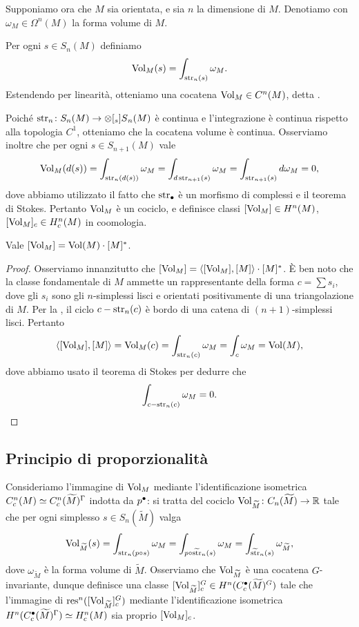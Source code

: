 Supponiamo ora che $M$ sia orientata, e sia $n$ la dimensione di $M$. Denotiamo con $\omega_M\in\Omega^n(M)$ la forma volume di $M$.
\begin{definition}
Per ogni $s\in S_n(M)$ definiamo
\[
\operatorname{Vol}_M(s)=\int_{\operatorname{str}_n(s)}\omega_M.
\]
Estendendo per linearità, otteniamo una cocatena $\operatorname{Vol}_M\in C^n(M)$, detta .
\end{definition}
Poiché $\map{\str_n}{S_n(M)}{\prepost[_s]{S}{_n}(M)}$ è continua e l'integrazione è continua rispetto alla topologia $C^1$, otteniamo che la cocatena volume è continua. Osserviamo inoltre che per ogni $s\in S_{n+1}(M)$ vale
\[
\operatorname{Vol}_M(d(s))=\int_{\operatorname{str}_n(d(s))}\omega_M=\int_{d\operatorname{str}_{n+1}(s)}\omega_M=\int_{\operatorname{str}_{n+1}(s)}d\omega_M=0,
\]
dove abbiamo utilizzato il fatto che $\operatorname{str}_\bullet$ è un morfismo di complessi e il teorema di Stokes. Pertanto $\operatorname{Vol}_M$ è un cociclo, e definisce classi $[\operatorname{Vol}_M]\in H^n(M)$, $[\operatorname{Vol}_M]_c\in H^n_c(M)$ in coomologia.

\begin{lemma}
Vale $[\operatorname{Vol}_M]=\operatorname{Vol}(M)\cdot[M]^*$.
\end{lemma}
\begin{proof}
Osserviamo innanzitutto che $[\operatorname{Vol}_M]=\langle[\operatorname{Vol}_M],[M]\rangle\cdot[M]^*$. È ben noto che la classe fondamentale di $M$ ammette un rappresentante della forma $c=\sum s_i$, dove gli $s_i$ sono gli $n$-simplessi lisci e orientati positivamente di una triangolazione di $M$. Per la , il ciclo $c-\operatorname{str}_n(c)$ è bordo di una catena di $(n+1)$-simplessi lisci. Pertanto
\[
\langle[\operatorname{Vol}_M],[M]\rangle=\operatorname{Vol}_M(c)=\int_{\operatorname{str}_n(c)}\omega_M=\int_{c}\omega_M=\operatorname{Vol}(M),
\]
dove abbiamo usato il teorema di Stokes per dedurre che
\[
\int_{c-\operatorname{str}_n(c)}\omega_M=0.\qedhere
\]
\end{proof}

\subsection{Principio di proporzionalità}

Consideriamo l'immagine di $\operatorname{Vol}_M$ mediante l'identificazione isometrica $C^n_c(M)\simeq C^n_c(\widetilde M)^\Gamma$ indotta da $p^\bullet$: si tratta del cociclo $\map{\Vol_{\widetilde M}}{C_n(\widetilde M)}{\RR}$ tale che per ogni simplesso $s\in S_n(\widetilde M)$ valga
\[
\operatorname{Vol}_{\widetilde M}(s)=\int_{\operatorname{str}_n(p\circ s)}\omega_M=\int_{p\circ\widetilde{\operatorname{str}}_n(s)}\omega_M=\int_{\widetilde{\operatorname{str}}_n(s)}\omega_{\widetilde M},
\]
dove $\omega_{\widetilde M}$ è la forma volume di $\widetilde M$. Osserviamo che $\operatorname{Vol}_{\widetilde M}$ è una cocatena $G$-invariante, dunque definisce una classe $[\operatorname{Vol}_{\widetilde M}]^G_c\in H^n(C^\bullet_c(\widetilde M)^G)$ tale che l'immagine di $\operatorname{res}^n([\operatorname{Vol}_{\widetilde M}]^G_c)$ mediante l'identificazione isometrica $H^n(C^\bullet_c(\widetilde M)^\Gamma)\simeq H^n_c(M)$ sia proprio $[\operatorname{Vol}_M]_c$.

